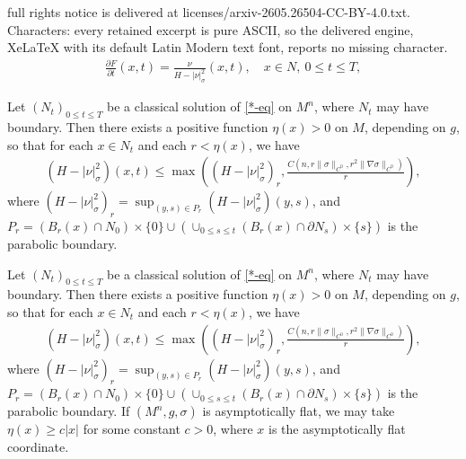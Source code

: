 \documentclass[10pt,a4paper]{amsart}
\begin{document}
full rights notice is delivered at licenses/arxiv-2605.26504-CC-BY-4.0.txt. Characters: every retained excerpt is pure ASCII, so the delivered engine, XeLaTeX with its default Latin Modern text font, reports no missing character.
\begin{align}\label{*-eq}
	\frac{\partial F}{\partial t}(x,t) = \frac{\nu }{H- |\nu |^2_{\sigma }}(x,t),\quad x \in N,\ 0 \leq t \leq T, \tag*{$(*)$}
\end{align} 

\begin{lem}\label{local-estimate-mean-curv}
Let $(N_t)_{0 \leq t \leq T}$ be a classical solution of \ref{*-eq} on $M^{n}$, where $N_t$ may have boundary. Then there exists a positive function $\eta (x) >0$ on $M$, depending on $g$, so that for each $x \in N_t$ and each $r< \eta(x)$, we have 
	\begin{align}
		(H - |\nu |^2_{\sigma })(x, t) \leq \max \left( (H-|\nu |^2_{\sigma })_r, \frac{C(n, r \|\sigma \|_{C^0}, r ^2 \|\nabla \sigma \|_{C^0})}{r} \right) ,
	\end{align}
	where $ (H-|\nu |^2_{\sigma })_r = \sup_{(y,s) \in P_r} (H-|\nu |^2_{\sigma })(y,s)$, and $P_r = (B_r(x) \cap N_0) \times \{0\} \cup \left( \cup _{0 \leq s \leq t}(B_r(x)\cap \partial N_s) \times \{ s\}  \right) $ is the parabolic boundary. 
\end{lem}

\begin{lem}\label{appen-local-estimate-mean-curv}
	Let $(N_t)_{0 \leq t \leq T}$ be a classical solution of \ref{*-eq} on $M^{n}$, where $N_t$ may have boundary. Then there exists a positive function $\eta (x) >0$ on $M$, depending on $g$, so that for each $x \in N_t$ and each $r< \eta(x)$, we have 
	\begin{align}
		(H - |\nu |^2_{\sigma })(x, t) \leq \max \left( (H-|\nu |^2_{\sigma })_r, \frac{C(n, r\|\sigma \|_{C^0}, r ^2 \|\nabla \sigma \|_{C^0})}{r} \right) ,
	\end{align}
	where $ (H-|\nu |^2_{\sigma })_r = \sup_{(y,s) \in P_r} (H-|\nu |^2_{\sigma })(y,s)$, and $P_r = (B_r(x) \cap N_0) \times \{0\} \cup \left( \cup _{0 \leq s \leq t}(B_r(x)\cap \partial N_s) \times \{ s\}  \right) $ is the parabolic boundary. 
If $(M^n, g ,\sigma  )$ is asymptotically flat, we may take $\eta(x) \geq c |x| $ for some constant $c>0$, where $x$ is the asymptotically flat coordinate.
\end{lem}
\end{document}
